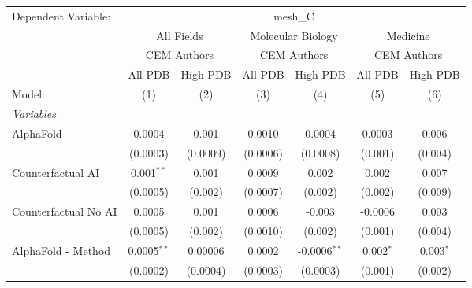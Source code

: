 \begingroup
\centering
\begin{tabular}{lcccccc}
   \tabularnewline \midrule \midrule
   Dependent Variable: & \multicolumn{6}{c}{mesh\_C}\\
 & \multicolumn{2}{c}{All Fields} & \multicolumn{2}{c}{Molecular Biology} & \multicolumn{2}{c}{Medicine} \\
\cmidrule(lr){2-3} \cmidrule(lr){4-5} \cmidrule(lr){6-7}
 & \multicolumn{2}{c}{CEM Authors} & \multicolumn{2}{c}{CEM Authors} & \multicolumn{2}{c}{CEM Authors} \\
\cmidrule(lr){2-3} \cmidrule(lr){4-5} \cmidrule(lr){6-7}
 & \multicolumn{1}{c}{All PDB} & \multicolumn{1}{c}{High PDB} & \multicolumn{1}{c}{All PDB} & \multicolumn{1}{c}{High PDB} & \multicolumn{1}{c}{All PDB} & \multicolumn{1}{c}{High PDB} \\
\cmidrule(lr){2-2} \cmidrule(lr){3-3} \cmidrule(lr){4-4} \cmidrule(lr){5-5} \cmidrule(lr){6-6} \cmidrule(lr){7-7}
   Model:                                                     & (1)           & (2)      & (3)      & (4)            & (5)         & (6)\\  
   \midrule
   \emph{Variables}\\
   AlphaFold                                                  & 0.0004        & 0.001    & 0.0010   & 0.0004         & 0.0003      & 0.006\\   
                                                              & (0.0003)      & (0.0009) & (0.0006) & (0.0008)       & (0.001)     & (0.004)\\   
   Counterfactual AI                                          & 0.001$^{**}$  & 0.001    & 0.0009   & 0.002          & 0.002       & 0.007\\   
                                                              & (0.0005)      & (0.002)  & (0.0007) & (0.002)        & (0.002)     & (0.009)\\   
   Counterfactual No AI                                       & 0.0005        & 0.001    & 0.0006   & -0.003         & -0.0006     & 0.003\\   
                                                              & (0.0005)      & (0.002)  & (0.0010) & (0.002)        & (0.001)     & (0.004)\\   
   AlphaFold - Method                                         & 0.0005$^{**}$ & 0.00006  & 0.0002   & -0.0006$^{**}$ & 0.002$^{*}$ & 0.003$^{*}$\\   
                                                              & (0.0002)      & (0.0004) & (0.0003) & (0.0003)       & (0.001)     & (0.002)\\   

\end{tabular}
